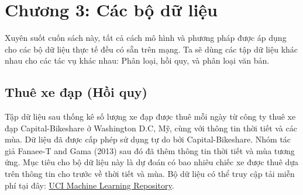 \chapter*{Chương 3: Các bộ dữ liệu}

Xuyên suốt cuốn sách này, tất cả cách mô hình và phương pháp được áp dụng cho các bộ dữ liệu thực tế đều có sẵn trên mạng. Ta sẽ dùng các tập dữ liệu khác nhau cho các tác vụ khác nhau: Phân loại, hồi quy, và phân loại văn bản.

\section{Thuê xe đạp (Hồi quy)}\label{chap_3.1}
Tập dữ liệu sau thống kê số lượng xe đạp được thuê mỗi ngày từ công ty thuê xe đạp Capital-Bikeshare ở Washington D.C, Mỹ, cùng với thông tin thời tiết và các mùa. Dữ liệu đã được cấp phép sử dụng tự do bởi Capital-Bikeshare. Nhóm tác giả Fanaee-T and Gama (2013) sau đó đã thêm thông tin thời tiết và mùa tương ứng. Mục tiêu cho bộ dữ liệu này là dự đoán có bao nhiêu chiếc xe được thuê dựa trên thông tin cho trước về thời tiết và mùa. Bộ dữ liệu có thể truy cập tải miễn phí tại đây: \href{http://archive.ics.uci.edu/ml/datasets/Bike+Sharing+Dataset}{UCI Machine Learning Repository}. 

